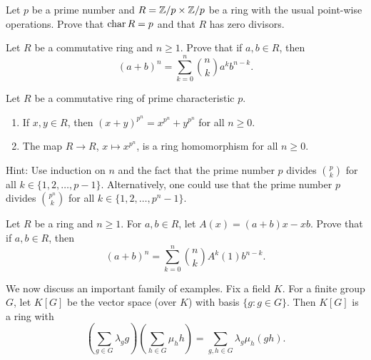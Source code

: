 \begin{exercise}
    Let $p$ be a prime number and 
    $R=\mathbb{Z}/p\times\mathbb{Z}/p$ be a ring with the usual point-wise operations. 
    Prove that $\operatorname{char} R=p$ and that $R$ has zero divisors. 
\end{exercise}

\begin{exercise}
    Let $R$ be a commutative ring and $n\geq1$. Prove that
    if $a,b\in R$, then 
    \[
    (a+b)^n=\sum_{k=0}^n\binom{n}{k}a^kb^{n-k}.
    \]
\end{exercise}    

\begin{exercise}
\label{xca:freshman_dream}
    Let $R$ be a commutative ring of prime characteristic $p$. 
    \begin{enumerate}
        \item If $x,y\in R$, then $(x+y)^{p^n}=x^{p^n}+y^{p^n}$ for all $n\geq0$. 
        \item The map $R\to R$, $x\mapsto x^{p^n}$, is a ring homomorphism for all $n\geq0$.
    \end{enumerate}
\end{exercise}

Hint: Use induction on $n$ and the fact that the prime number $p$ divides 
$\binom{p}{k}$ for all $k\in\{1,2,\dots,p-1\}$. Alternatively, one could use
that the prime number $p$ divides $\binom{p^n}{k}$ for all 
$k\in\{1,2,\dots,p^n-1\}$. 

\begin{exercise}
    Let $R$ be a ring and $n\geq1$. 
    For $a,b\in R$, let $A(x)=(a+b)x-xb$. 
    Prove that
    if $a,b\in R$, then 
    \[
    (a+b)^n=\sum_{k=0}^n\binom{n}{k}A^k(1)b^{n-k}.
    \] 
\end{exercise}



We now discuss an important family of examples. 
Fix a field $K$. 
For a finite group $G$, let $K[G]$ be the vector space (over $K$)
with basis $\{g:g\in G\}$. Then $K[G]$ is a ring
with
\[
\left(\sum_{g\in G}\lambda_gg\right)\left(\sum_{h\in G}\mu_hh\right)
=\sum_{g,h\in G}\lambda_g\mu_h(gh).
\] 

